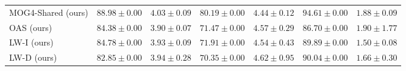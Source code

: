 \begin{table}[htb]
\begin{tabularx}{\textwidth}{lXXXXXX}
		\rowcolor{gray!15} MOG4-Shared (ours)      & $88.98 \pm 0.00$ & $4.03 \pm 0.09$ & $\mathbf{80.19 \pm 0.00}$ & $4.44 \pm 0.12$ & $\mathbf{94.61 \pm 0.00}$ & $1.88 \pm 0.09$ \\
		\rowcolor{gray!15} OAS (ours)              & $84.38 \pm 0.00$ & $3.90 \pm 0.07$ & $71.47 \pm 0.00$ & $4.57 \pm 0.29$ & $86.70 \pm 0.00$ & $1.90 \pm 1.77$ \\
		\rowcolor{gray!15} LW-I (ours)             & $84.78 \pm 0.00$ & $3.93 \pm 0.09$ & $71.91 \pm 0.00$ & $4.54 \pm 0.43$ & $89.89 \pm 0.00$ & $1.50 \pm 0.08$ \\
		\rowcolor{gray!15} LW-D (ours)             & $82.85 \pm 0.00$ & $3.94 \pm 0.28$ & $70.35 \pm 0.00$ & $4.62 \pm 0.95$ & $90.04 \pm 0.00$ & $1.66 \pm 0.30$ \\
		\bottomrule
	\end{tabularx}
\end{table}

